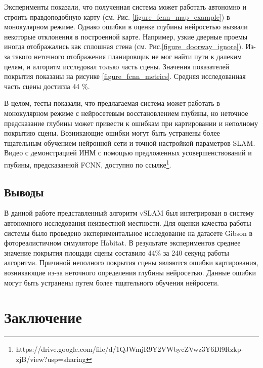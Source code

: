 \documentclass{mipt-thesis-ms}
\begin{document}
	Эксперименты показали, что полученная система может работать автономно и строить правдоподобную карту (см. Рис. \ref{figure_fcnn_map_example}) в монокулярном режиме. Однако ошибки в оценке глубины нейросетью вызвали некоторые отклонения в построенной карте. Например, узкие дверные проемы иногда отображались как сплошная стена (см. Рис.\ref{figure_doorway_ignore}). Из-за такого неточного отображения планировщик не мог найти пути к далеким целям, и алгоритм исследовал только часть сцены. Значения показателей покрытия показаны на рисунке \ref{figure_fcnn_metrics}. Средняя исследованная часть сцены достигла 44 \%.
	
	В целом, тесты показали, что предлагаемая система может работать в монокулярном режиме с нейросетевым восстановлением глубины, но неточное предсказание глубины может привести к ошибкам при картировании и неполному покрытию сцены. Возникающие ошибки могут быть устранены более тщательным обучением нейронной сети и точной настройкой параметров SLAM. Видео с демонстрацией ИНМ с помощью предложенных усовершенствований и глубины, предсказанной FCNN, доступно по ссылке\footnote{https://drive.google.com/file/d/1QJWmjR9Y2VWbycZVwz3Y6Dl9Rzkp-zjB/view?usp=sharing}.
	
	\section{Выводы}
	
	В данной работе представленный алгоритм vSLAM был интегрирован в систему автономного исследования неизвестной местности. Для оценки качества работы системы было проведено экспериментальное исследование на датасете Gibson в фотореалистичном симуляторе Habitat. В результате экспериментов среднее значение покрытия площади сцены составило 44\% за 240 секунд работы алгоритма. Причиной неполного покрытия сцены являются ошибки картирования, возникающие из-за неточного определения глубины нейросетью. Данные ошибки могут быть устранены путем более тщательного обучения нейросети.
	
	
	\chapter{Заключение}
	
\end{document}
